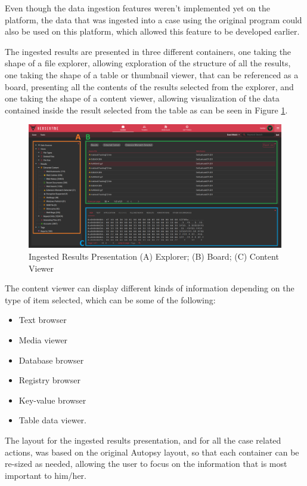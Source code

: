 Even though the data ingestion features weren't implemented yet on the platform, the data that was ingested into a case using the original program could also be used on this platform, which allowed this feature to be developed earlier.

The ingested results are presented in three different containers, one taking the shape of a file explorer, allowing exploration of the structure of all the results, 
one taking the shape of a table or thumbnail viewer, that can be referenced as a board, presenting all the contents of the results selected from the explorer, and one taking the shape of a content viewer, allowing visualization
of the data contained inside the result selected from the table as can be seen in Figure \ref{fig:data}.

\begin{figure}[ht]
 \centering
 \includegraphics[width=1\linewidth]{imgs/data.png}
 \caption{Ingested Results Presentation (A) Explorer; (B) Board; (C) Content Viewer}
 \label{fig:data}
\end{figure}

The content viewer can display different kinds of information depending on the type of item selected, which can be some of the following:
\begin{itemize}
 \item Text browser
 \item Media viewer
 \item Database browser
 \item Registry browser
 \item Key-value browser
 \item Table data viewer.
\end{itemize}

The layout for the ingested results presentation, and for all the case related actions, was based on the original Autopsy layout, so that each container can be re-sized as
needed, allowing the user to focus on the information that is most important to him/her.

